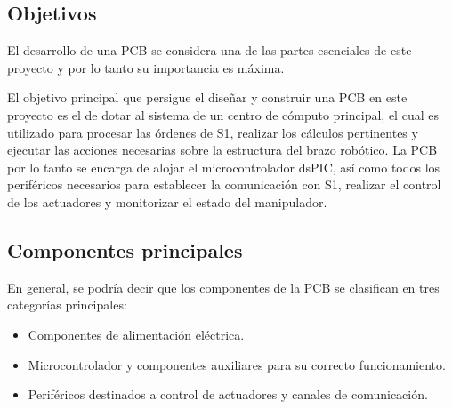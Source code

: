 \subsection{Objetivos}

El desarrollo de una \ac{PCB} se considera una de las partes esenciales de este proyecto y por lo tanto su importancia es máxima.

El objetivo principal que persigue el diseñar y construir una \ac{PCB} en este proyecto es el de dotar al sistema de un centro de cómputo principal, el cual es utilizado para procesar las órdenes de S1, realizar los cálculos pertinentes y ejecutar las acciones necesarias sobre la estructura del brazo robótico. La \ac{PCB} por lo tanto se encarga de alojar el microcontrolador dsPIC, así como todos los periféricos necesarios para establecer la comunicación con S1, realizar el control de los actuadores y monitorizar el estado del manipulador.

\subsection{Componentes principales}
\label{ssec:main_components}

En general, se podría decir que los componentes de la \ac{PCB} se clasifican en tres categorías principales:
\begin{itemize}
    \item Componentes de alimentación eléctrica.
    \item Microcontrolador y componentes auxiliares para su correcto funcionamiento.
    \item Periféricos destinados a control de actuadores y canales de comunicación.
\end{itemize}

